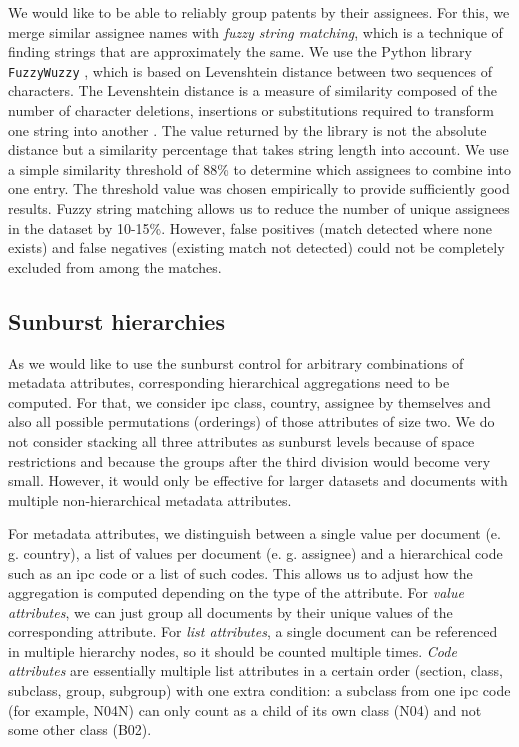 We would like to be able to reliably group patents by their assignees.
For this, we merge similar assignee names with \textit{fuzzy string matching}, which is a technique of finding strings that are approximately the same.
We use the Python library \verb|FuzzyWuzzy| \cite{Cohen2011}, which is based on Levenshtein distance between two sequences of characters.
The Levenshtein distance is a measure of similarity composed of the number of character deletions, insertions or substitutions required to transform one string into another \cite{levenshtein}.
The value returned by the library is not the absolute distance but a similarity percentage that takes string length into account.
We use a simple similarity threshold of 88\% to determine which assignees to combine into one entry.
The threshold value was chosen empirically to provide sufficiently good results.
Fuzzy string matching allows us to reduce the number of unique assignees in the dataset by 10-15\%.
However, false positives (match detected where none exists) and false negatives (existing match not detected) could not be completely excluded from among the matches.

\subsection{Sunburst hierarchies}
\label{subsec:hierarchies}

As we would like to use the sunburst control for arbitrary combinations of metadata attributes, corresponding hierarchical aggregations need to be computed.
For that, we consider \gls{ipc} class, country, assignee by themselves and also all possible permutations (orderings) of those attributes of size two.
We do not consider stacking all three attributes as sunburst levels because of space restrictions and because the groups after the third division would become very small.
However, it would only be effective for larger datasets and documents with multiple non-hierarchical metadata attributes.

For metadata attributes, we distinguish between a single value per document (e. g. country), a list of values per document (e. g. assignee) and a hierarchical code such as an \gls{ipc} code or a list of such codes.
This allows us to adjust how the aggregation is computed depending on the type of the attribute.
For \textit{value attributes}, we can just group all documents by their unique values of the corresponding attribute.
For \textit{list attributes}, a single document can be referenced in multiple hierarchy nodes, so it should be counted multiple times.
\textit{Code attributes} are essentially multiple list attributes in a certain order (section, class, subclass, group, subgroup) with one extra condition: a subclass from one \gls{ipc} code (for example, N04N) can only count as a child of its own class (N04) and not some other class (B02).

